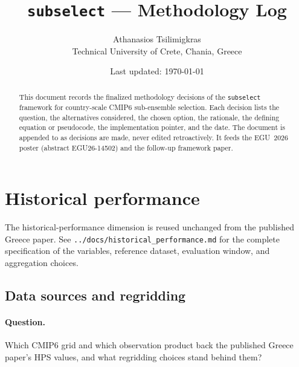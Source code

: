 \documentclass[11pt,a4paper]{article}
\title{\texttt{subselect} --- Methodology Log}
\author{Athanasios Tsilimigkras \\
        Technical University of Crete, Chania, Greece}
\date{Last updated: \today}
\begin{document}
\maketitle

\begin{abstract}
\noindent
This document records the finalized methodology decisions of the \texttt{subselect}
framework for country-scale CMIP6 sub-ensemble selection. Each decision lists the
question, the alternatives considered, the chosen option, the rationale, the
defining equation or pseudocode, the implementation pointer, and the date.
The document is appended to as decisions are made, never edited retroactively.
It feeds the EGU~2026 poster (abstract EGU26-14502)
and the follow-up framework paper.
\end{abstract}

\tableofcontents

\section{Historical performance}\label{sec:performance}

The historical-performance dimension is reused unchanged from the published Greece
paper. See \texttt{../docs/historical\_performance.md} for the complete specification
of the variables, reference dataset, evaluation window, and aggregation choices.


\subsection{Data sources and regridding}\label{sec:performance-data-sources}

\paragraph{Question.} Which CMIP6 grid and which observation product back
the published Greece paper's HPS values, and what regridding choices stand
behind them?
\end{document}

